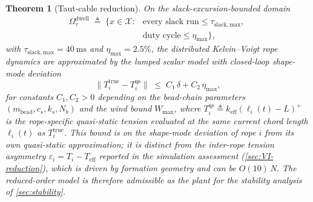\documentclass[lettersize,journal]{IEEEtran}
\newtheorem{theorem}{Theorem}%
\begin{document}
\begin{theorem}[Taut-cable reduction]
\label{thm:reduction}
On the slack-excursion-bounded domain
\begin{align}
\label{eq:omega-dwell}
  \Omega_\tau^{\mathrm{dwell}} \;\triangleq\;
    \bigl\{ x \in \mathcal{X} :
      &\text{every slack run} \le \tau_{\mathrm{slack,max}},\;\\
      &\text{duty cycle} \le \eta_{\max} \bigr\},\nonumber
\end{align}
with $\tau_{\mathrm{slack,max}} = \SI{40}{\milli\second}$ and $\eta_{\max} = 2.5\%$, the distributed Kelvin--Voigt rope dynamics are approximated by the lumped scalar model with closed-loop shape-mode deviation
\begin{equation}
  \|T_i^{\mathrm{true}} - T_i^{\mathrm{qs}}\|
    \;\le\; C_1\,\delta + C_2\,\eta_{\max},
  \label{eq:reduction-error}
\end{equation}
for constants $C_1, C_2 > 0$ depending on the bead-chain parameters $(m_{\mathrm{bead}}, c_s, k_s, N_b)$ and the wind bound $W_{\max}$, where $T_i^{\mathrm{qs}} \triangleq k_{\mathrm{eff}}(\ell_i(t) - L)^+$ is the\emph{ rope-specific} quasi-static tension evaluated at the \emph{same} current chord length $\ell_i(t)$ as $T_i^{\mathrm{true}}$.  This bound is on the shape-mode deviation of rope $i$ from its own quasi-static approximation; it is distinct from the inter-rope tension asymmetry $\varepsilon_i = T_i - T_{\mathrm{eff}}$ reported in the simulation assessment (\cref{sec:VI-reduction}), which is driven by formation geometry and can be $O(10)$\,N. The reduced-order model is therefore admissible as the plant for the stability analysis of \cref{sec:stability}.
\end{theorem}
\end{document}

